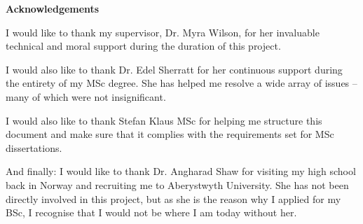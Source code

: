 \thispagestyle{empty}

\begin{center}
    {\LARGE\bf Acknowledgements}
\end{center}

I would like to thank my supervisor, Dr. Myra Wilson, for her invaluable technical and moral support during the duration of this project.

I would also like to thank Dr. Edel Sherratt for her continuous support during the entirety of my MSc degree. She has helped me resolve a wide array of issues -- many of which were not insignificant.

I would also like to thank Stefan Klaus MSc for helping me structure this document and make sure that it complies with the requirements set for MSc dissertations.

And finally: I would like to thank Dr. Angharad Shaw for visiting my high school back in Norway and recruiting me to Aberystwyth University.
She has not been directly involved in this project, but as she is the reason why I applied for my BSc, I recognise that I would not be where I am today without her.